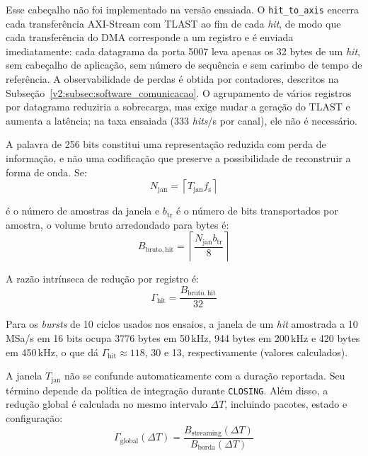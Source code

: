 Esse cabeçalho não foi implementado na versão ensaiada. O \texttt{hit\_to\_axis} encerra cada transferência AXI-Stream com TLAST ao fim de cada \textit{hit}, de modo que cada transferência do DMA corresponde a um registro e é enviada imediatamente: cada datagrama da porta 5007 leva apenas os 32 bytes de um \textit{hit}, sem cabeçalho de aplicação, sem número de sequência e sem carimbo de tempo de referência. A observabilidade de perdas é obtida por contadores, descritos na Subseção~\ref{v2:subsec:software_comunicacao}. O agrupamento de vários registros por datagrama reduziria a sobrecarga, mas exige mudar a geração do TLAST e aumenta a latência; na taxa ensaiada (333 \textit{hits}/s por canal), ele não é necessário.

A palavra de 256 bits constitui uma representação reduzida com perda de informação, e não uma codificação que preserve a possibilidade de reconstruir a forma de onda. Se:
\begin{equation}
	N_{\mathrm{jan}} = \left\lceil T_{\mathrm{jan}}f_{\mathrm{s}} \right\rceil 
	\label{v2:eq:numero_amostras_janela}
\end{equation}

\noindent
é o número de amostras da janela e \(b_{\mathrm{tr}}\) é o número de bits transportados por amostra, o volume bruto arredondado para bytes é:
\begin{equation}
	B_{\mathrm{bruto,hit}} = \left\lceil \frac{N_{\mathrm{jan}}b_{\mathrm{tr}}}{8} \right\rceil
	\label{v2:eq:volume_bruto_hit}
\end{equation}

A razão intrínseca de redução por registro é:
\begin{equation}
	\Gamma_{\mathrm{hit}} = \frac{B_{\mathrm{bruto,hit}}}{32}
	\label{v2:eq:reducao_por_hit}
\end{equation}

Para os \textit{bursts} de 10 ciclos usados nos ensaios, a janela de um \textit{hit} amostrada a 10\,MSa/s em 16 bits ocupa 3776 bytes em 50\,kHz, 944 bytes em 200\,kHz e 420 bytes em 450\,kHz, o que dá \(\Gamma_{\mathrm{hit}} \approx 118\), 30 e 13, respectivamente (valores calculados).

A janela \(T_{\mathrm{jan}}\) não se confunde automaticamente com a duração reportada. Seu término depende da política de integração durante \texttt{CLOSING}. Além disso, a redução global é calculada no mesmo intervalo \(\Delta T\), incluindo pacotes, estado e configuração:
\begin{equation}
	\Gamma_{\mathrm{global}}(\Delta T) = \frac{B_{\mathrm{streaming}}(\Delta T)}{B_{\mathrm{borda}}(\Delta T)}
	\label{v2:eq:reducao_global}
\end{equation}


